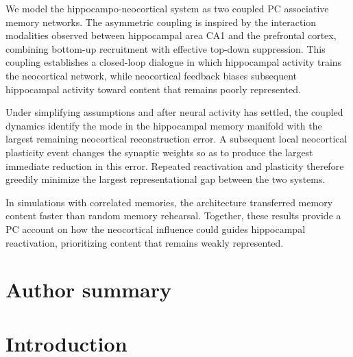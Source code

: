 \documentclass[10pt,letterpaper]{article}
\theoremstyle{plain}
\theoremstyle{remark}
\begin{document}
We model the hippocampo-neocortical system as two coupled PC associative memory networks. The asymmetric coupling is inspired by the interaction modalities observed between hippocampal area CA1 and the prefrontal cortex, combining bottom-up recruitment with effective top-down suppression. This coupling establishes a closed-loop dialogue in which hippocampal activity trains the neocortical network, while neocortical feedback biases subsequent hippocampal activity toward content that remains poorly represented.

Under simplifying assumptions and after neural activity has settled, the coupled dynamics identify the mode in the hippocampal memory manifold with the largest remaining neocortical reconstruction error. A subsequent local neocortical plasticity event changes the synaptic weights so as to produce the largest immediate reduction in this error. Repeated reactivation and plasticity therefore greedily minimize the largest representational gap between the two systems.

In simulations with correlated memories, the architecture transferred memory content faster than random memory rehearsal. Together, these results provide a PC account on how the neocortical influence could guides hippocampal reactivation, prioritizing content that remains weakly represented.

\section*{Author summary}


\linenumbers

\newpage
\section{Introduction}
\end{document}
